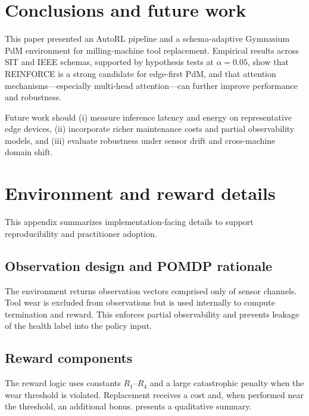 \documentclass[11pt]{article}
\begin{document}
\section{Conclusions and future work}
\label{sec:conclusion}
This paper presented an AutoRL pipeline and a schema-adaptive Gymnasium PdM environment for milling-machine tool replacement. Empirical results across SIT and IEEE schemas, supported by hypothesis tests at $\alpha=0.05$, show that REINFORCE is a strong candidate for edge-first PdM, and that attention mechanisms---especially multi-head attention---can further improve performance and robustness.

Future work should (i) measure inference latency and energy on representative edge devices, (ii) incorporate richer maintenance costs and partial observability models, and (iii) evaluate robustness under sensor drift and cross-machine domain shift.

\appendix
\section{Environment and reward details}
\label{app:env_reward}
This appendix summarizes implementation-facing details to support reproducibility and practitioner adoption.

\subsection{Observation design and POMDP rationale}
The environment returns observation vectors comprised only of sensor channels. Tool wear is excluded from observations but is used internally to compute termination and reward. This enforces partial observability and prevents leakage of the health label into the policy input.

\subsection{Reward components}
The reward logic uses constants $R_1$--$R_4$ and a large catastrophic penalty when the wear threshold is violated. Replacement receives a cost and, when performed near the threshold, an additional bonus.  presents a qualitative summary.
\end{document}
